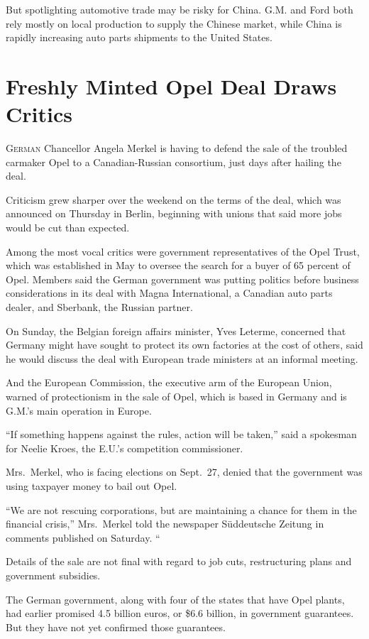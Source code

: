 ﻿\documentclass[12pt]{article}
\begin{document}
But spotlighting automotive trade may be risky for China. G.M. and Ford both rely mostly on local
production to supply the Chinese market, while China is rapidly increasing auto parts shipments to
the United States.

\section{Freshly Minted Opel Deal Draws Critics}

\lettrine{G}{erman} Chancellor Angela Merkel is having to defend the sale of the troubled carmaker
Opel to a Canadian-Russian consortium, just days after hailing the deal.

Criticism grew sharper over the weekend on the terms of the deal, which was announced on Thursday in
Berlin, beginning with unions that said more jobs would be cut than expected.

Among the most vocal\cite{vocal} critics were government representatives of the Opel Trust, which
was established in May to oversee the search for a buyer of 65 percent of Opel. Members said the
German government was putting politics before business considerations in its deal with Magna
International, a Canadian auto parts dealer, and Sberbank, the Russian partner.

On Sunday, the Belgian foreign affairs minister, Yves Leterme, concerned that Germany might have
sought to protect its own factories at the cost of others, said he would discuss the deal with
European trade ministers at an informal meeting.

And the European Commission, the executive arm of the European Union, warned of protectionism in the
sale of Opel, which is based in Germany and is G.M.'s main operation in Europe.

``If something happens against the rules, action will be taken,'' said a spokesman for Neelie Kroes,
the E.U.'s competition commissioner.

Mrs.~Merkel, who is facing elections on Sept.~27, denied that the government was using taxpayer
money to bail out Opel.

``We are not rescuing corporations, but are maintaining a chance for them in the financial crisis,''
Mrs.~Merkel told the newspaper Süddeutsche Zeitung in comments published on Saturday. ``

Details of the sale are not final with regard to job cuts, restructuring plans and government
subsidies.

The German government, along with four of the states that have Opel plants, had earlier promised 4.5
billion euros, or \$6.6 billion, in government guarantees. But they have not yet confirmed those
guarantees.
\end{document}
